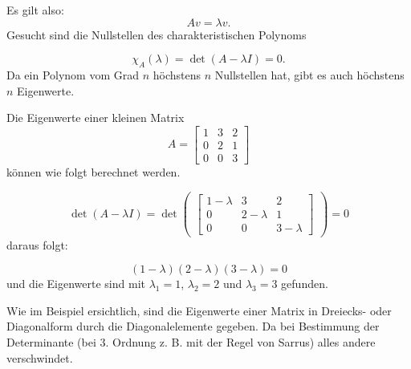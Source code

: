 Es gilt also:
\begin{equation}
	Av=\lambda v.
\end{equation}
Gesucht sind die Nullstellen des charakteristischen Polynoms

\begin{equation}
	\chi_A(\lambda)=\det(A-\lambda I) = 0.
\end{equation}
 Da ein Polynom vom Grad $n$ höchstens $n$ Nullstellen hat, gibt es auch höchstens $n$ Eigenwerte.

\begin{beispiel}
Die Eigenwerte einer kleinen Matrix
	\begin{equation}
	A =
	\begin{bmatrix}
	1 & 3 & 2 \\
	0 & 2 & 1 \\
	0 & 0 & 3
	\end{bmatrix}
	\end{equation}
können wie folgt berechnet werden.
	
	\begin{equation}
	\det(A-\lambda I)= \det
	\begin{pmatrix}
	\begin{bmatrix}
	1-\lambda & 3 & 2 \\
	0 & 2-\lambda & 1 \\
	0 & 0 & 3-\lambda
	\end{bmatrix}
	\end{pmatrix}
	= 0
	\end{equation}	
daraus folgt:
	
	\begin{equation} 
	(1-\lambda)(2-\lambda)(3-\lambda)=0
	\end{equation}
und die Eigenwerte sind mit $\lambda_{1}=1$, $\lambda_{2}=2$ und $\lambda_{3}=3$ gefunden.
\end{beispiel}

Wie im Beispiel ersichtlich, sind die Eigenwerte einer Matrix in Dreiecks- oder Diagonalform durch die Diagonalelemente gegeben.
Da bei Bestimmung der Determinante (bei 3. Ordnung z. B. mit der Regel von Sarrus) alles andere verschwindet.

